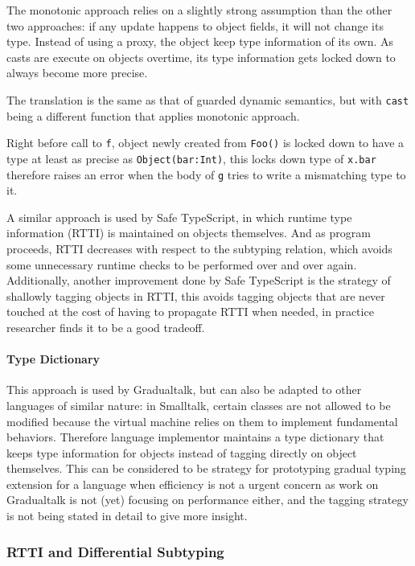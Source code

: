 The monotonic approach relies on a slightly strong assumption than the other two approaches:
if any update happens to object fields, it will not change its type.
Instead of using a proxy, the object keep type information of its own. As casts are execute on objects
overtime, its type information gets locked down to always become more precise.

The translation is the same as that of guarded dynamic semantics, but with \texttt{cast} being a different
function that applies monotonic approach.

Right before call to \texttt{f}, object newly created from \texttt{Foo()} is locked down to
have a type at least as precise as \texttt{Object({bar:Int})}, this locks down type of \texttt{x.bar}
therefore raises an error when the body of \texttt{g} tries to write a mismatching type to it.

A similar approach is used by Safe TypeScript, in which runtime type information (RTTI) is maintained on
objects themselves. And as program proceeds, RTTI decreases with respect to the subtyping relation,
which avoids some unnecessary runtime checks to be performed over and over again.
Additionally, another improvement done by Safe TypeScript is
the strategy of shallowly tagging objects in RTTI, this avoids tagging objects that are never touched
at the cost of having to propagate RTTI when needed, in practice researcher finds it to be a good tradeoff.

\paragraph{Type Dictionary}

This approach is used by Gradualtalk, but can also be adapted to other languages of similar nature:
in Smalltalk, certain classes are not allowed to be modified because
the virtual machine relies on them to implement fundamental behaviors.
Therefore language implementor maintains a type dictionary that keeps type information for objects
instead of tagging directly on object themselves.
This can be considered to be strategy for prototyping gradual typing extension for a language when
efficiency is not a urgent concern as work on Gradualtalk is not (yet) focusing on performance either,
and the tagging strategy is not being stated in detail to give more insight.

\subsubsection{RTTI and Differential Subtyping}

